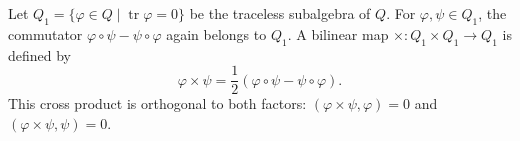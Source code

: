 Let $Q_1 = \{\varphi \in Q \mid \operatorname{tr} \varphi = 0\}$ be the traceless subalgebra of $Q$. For $\varphi, \psi \in Q_1$, the commutator $\varphi \circ \psi - \psi \circ \varphi$ again belongs to $Q_1$. A bilinear map $\times \colon Q_1 \times Q_1 \to Q_1$ is defined by
$$
\varphi \times \psi = \frac{1}{2}(\varphi \circ \psi - \psi \circ \varphi).
$$
This cross product is orthogonal to both factors: $(\varphi \times \psi, \varphi) = 0$ and $(\varphi \times \psi, \psi) = 0$.
